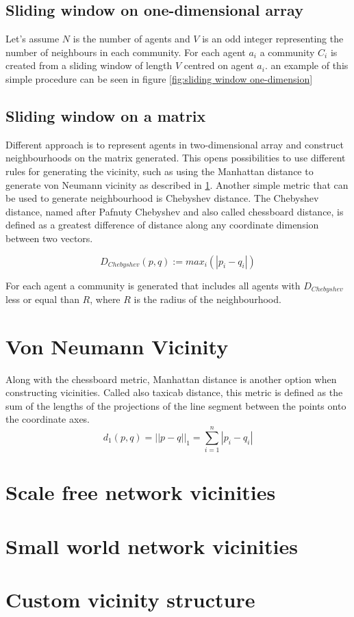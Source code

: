 \subsection{Sliding window on one-dimensional array}

Let's assume $N$ is the number of agents and $V$ is an odd integer representing the number of neighbours in each community.
For each agent $a_i$ a community $C_i$ is created from a sliding window of length $V$ centred on agent $a_i$.
an example of this simple procedure can be seen in figure \ref{fig:sliding window one-dimension}



\subsection{Sliding window on a matrix}

Different approach is to represent agents in two-dimensional array and construct neighbourhoods on the matrix generated.
This opens possibilities to use different rules for generating the vicinity, such as using the Manhattan distance to generate von Neumann vicinity as described in \ref{sec:von neumann}.
Another simple metric that can be used to generate neighbourhood is Chebyshev distance.
The Chebyshev distance, named after Pafnuty Chebyshev and also called chessboard distance, is defined as a greatest difference of distance along any coordinate dimension between two vectors.

\begin{displaymath}
D_{Chebyshev}(p,q) := max_i (|p_i-q_i|) 
\end{displaymath}

For each agent a community is generated that includes all agents with $D_{Chebyshev}$ less or equal than $R$, where $R$ is the radius of the neighbourhood.



\section{Von Neumann Vicinity}
\label{sec:von neumann}

Along with the chessboard metric, Manhattan distance is another option when constructing vicinities.
Called also taxicab distance, this metric is defined as the sum of the lengths of the projections of the line segment between the points onto the coordinate axes.
\begin{displaymath}
d_1(p,q) = ||p-q||_1 = \sum_{i=1}^n |p_i - q_i|
\end{displaymath}





\section{Scale free network vicinities}
\label{sec:scale free}

\section{Small world network vicinities}
\label{sec:small world}

\section{Custom vicinity structure}
\label{sec:custom vicinity}